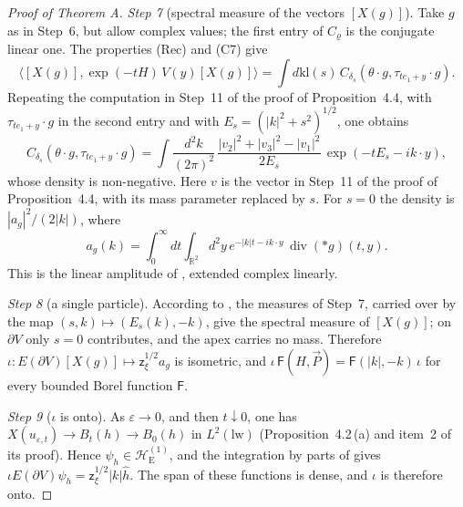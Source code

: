 \documentclass[11pt,letterpaper,reqno]{amsart}
\theoremstyle{definition}
\begin{document}
\begin{proof}[Proof of Theorem A]
\emph{Step 7} (spectral measure of the vectors $[X(g)]$).
Take $g$ as in Step~6, but allow complex values;
the first entry of $C_\varrho$ is the conjugate linear one.
The properties (Rec) and (C7) give
\begin{equation*}
\bigl\langle[X(g)],\exp(-tH)\,V(y)[X(g)]\bigr\rangle=\int d\mathrm{kl}(s)\,C_{\delta_s}(\theta\cdot g,\tau_{te_1+y}\cdot g).
\end{equation*}
Repeating the computation in Step~11 of the proof of Proposition~4.4, with $\tau_{te_1+y}\cdot g$ in the second entry and with $E_s=(|k|^2+s^2)^{1/2}$, one obtains
\begin{equation*}
C_{\delta_s}(\theta\cdot g,\tau_{te_1+y}\cdot g)=\int\frac{d^2k}{(2\pi)^2}\,\frac{|v_2|^2+|v_3|^2-|v_1|^2}{2E_s}\,\exp(-tE_s-ik\cdot y),
\end{equation*}
whose density is non-negative.
Here $v$ is the vector in Step~11 of the proof of Proposition~4.4, with its mass parameter replaced by $s$.
For $s=0$ the density is $|a_g|^2/(2|k|)$, where
\[
a_g(k)=\int_0^\infty dt\int_{\mathbb R^2}d^2y\,
e^{-|k|t-ik\cdot y}\,\operatorname{div}(\ast g)(t,y).
\]
This is the linear amplitude of \cite[Lemma~12.26(a), Remark~12.27]{QEDII}, extended complex linearly.

\emph{Step 8} (a single particle).
According to \cite[Lemma~12.25]{QEDII}, the measures of Step~7, carried over by the map $(s,k)\mapsto(E_s(k),-k)$, give the spectral measure of $[X(g)]$;
on $\partial V$ only $s=0$ contributes, and the apex carries no mass.
Therefore $\iota\colon E(\partial V)[X(g)]\mapsto\mathsf z_\xi^{1/2}a_g$ is isometric, and $\iota\,\mathsf F(H,\vec P)=\mathsf F(|k|,-k)\,\iota$ for every bounded Borel function $\mathsf F$.

\emph{Step 9} ($\iota$ is onto).
As $\varepsilon\to0$, and then $t\downarrow0$, one has $X(u_{\varepsilon,t})\to B_t(h)\to B_0(h)$ in $L^2(\mathrm{lw})$ (Proposition~4.2\,(a) and item~2 of its proof).
Hence $\psi_h\in\mathcal H_{\mathrm E}^{(1)}$, and the integration by parts of \cite[Lemma~12.26\,(c)]{QEDII} gives $\iota E(\partial V)\psi_h=\mathsf z_\xi^{1/2}|k|\hat h$.
The span of these functions is dense, and $\iota$ is therefore onto.


\end{proof}
\end{document}
